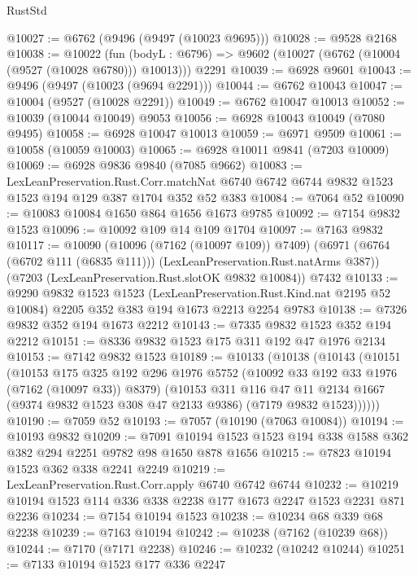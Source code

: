 \begin{lexlean}{RustStd}
\begin{coremodule}
@10027 := @6762 (@9496 (@9497 (@10023 @9695)))
@10028 := @9528 @2168
@10038 := @10022
    (fun (bodyL : @6796) => @9602 (@10027 (@6762 (@10004 (@9527 (@10028 @6780))) @10013)))
    @2291
@10039 := @6928 @9601
@10043 := @9496 (@9497 (@10023 (@9694 @2291)))
@10044 := @6762 @10043
@10047 := @10004 (@9527 (@10028 @2291))
@10049 := @6762 @10047 @10013
@10052 := @10039 (@10044 @10049) @9053
@10056 := @6928 @10043 @10049 (@7080 @9495)
@10058 := @6928 @10047 @10013
@10059 := @6971 @9509
@10061 := @10058 (@10059 @10003)
@10065 := @6928 @10011 @9841 (@7203 @10009)
@10069 := @6928 @9836 @9840 (@7085 @9662)
@10083 := LexLeanPreservation.Rust.Corr.matchNat
    @6740
    @6742
    @6744
    @9832
    @1523
    @1523
    @194
    @129
    @387
    @1704
    @352
    @52
    @383
@10084 := @7064 @52
@10090 := @10083 @10084 @1650 @864 @1656 @1673 @9785
@10092 := @7154 @9832 @1523
@10096 := @10092 @109 @14 @109 @1704
@10097 := @7163 @9832
@10117 := @10090
    (@10096 (@7162 (@10097 @109)) @7409)
    (@6971 (@6764 (@6702 @111 (@6835 @111))) (LexLeanPreservation.Rust.natArms @387))
    (@7203 (LexLeanPreservation.Rust.slotOK @9832 @10084))
    @7432
@10133 := @9290
    @9832
    @1523
    @1523
    (LexLeanPreservation.Rust.Kind.nat @2195 @52 @10084)
    @2205
    @352
    @383
    @194
    @1673
    @2213
    @2254
    @9783
@10138 := @7326 @9832 @352 @194 @1673 @2212
@10143 := @7335 @9832 @1523 @352 @194 @2212
@10151 := @8336 @9832 @1523 @175 @311 @192 @47 @1976 @2134
@10153 := @7142 @9832 @1523
@10189 := @10133
    (@10138
      (@10143
        (@10151
          (@10153
            @175
            @325
            @192
            @296
            @1976
            @5752
            (@10092 @33 @192 @33 @1976 (@7162 (@10097 @33)) @8379)
            (@10153
              @311
              @116
              @47
              @11
              @2134
              @1667
              (@9374 @9832 @1523 @308 @47 @2133 @9386)
              (@7179 @9832 @1523))))))
@10190 := @7059 @52
@10193 := @7057 (@10190 (@7063 @10084))
@10194 := @10193 @9832
@10209 := @7091 @10194 @1523 @1523 @194 @338 @1588 @362 @382 @294 @2251 @9782 @98 @1650 @878 @1656
@10215 := @7823 @10194 @1523 @362 @338 @2241 @2249
@10219 := LexLeanPreservation.Rust.Corr.apply @6740 @6742 @6744
@10232 := @10219 @10194 @1523 @114 @336 @338 @2238 @177 @1673 @2247 @1523 @2231 @871 @2236
@10234 := @7154 @10194 @1523
@10238 := @10234 @68 @339 @68 @2238
@10239 := @7163 @10194
@10242 := @10238 (@7162 (@10239 @68))
@10244 := @7170 (@7171 @2238)
@10246 := @10232 (@10242 @10244)
@10251 := @7133 @10194 @1523 @177 @336 @2247

\end{coremodule}
\end{lexlean}
